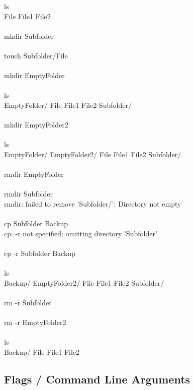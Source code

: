\begin{bash}
\p[~/Folder] ls\\
File  File1  File2\\
\\
\p[~/Folder] mkdir Subfolder\\
\\
\p[~/Folder] touch Subfolder/File\\
\\
\p[~/Folder] mkdir EmptyFolder\\
\\
\p[~/Folder] ls\\
EmptyFolder/  File  File1  File2  Subfolder/\\
\\
\p[~/Folder] mkdir EmptyFolder2\\
\\
\p[~/Folder] ls\\
EmptyFolder/  EmptyFolder2/  File  File1  File2  Subfolder/\\
\\
\p[~/Folder] rmdir EmptyFolder\\
\\
\p[~/Folder] rmdir Subfolder\\
rmdir: failed to remove 'Subfolder/': Directory not empty\\
\\
\p[~/Folder] cp Subfolder Backup\\
cp: -r not specified; omitting directory 'Subfolder'\\
\\
\p[~/Folder] cp -r Subfolder Backup\\
\\
\p[~/Folder] ls\\
Backup/  EmptyFolder2/  File  File1  File2  Subfolder/\\
\\
\p[~/Folder] rm -r Subfolder\\
\\
\p[~/Folder] rm -r EmptyFolder2\\
\\
\p[~/Folder] ls\\
Backup/  File  File1  File2\\
\end{bash}

\subsection{Flags / Command Line Arguments}\label{flags-command-line-arguments}

